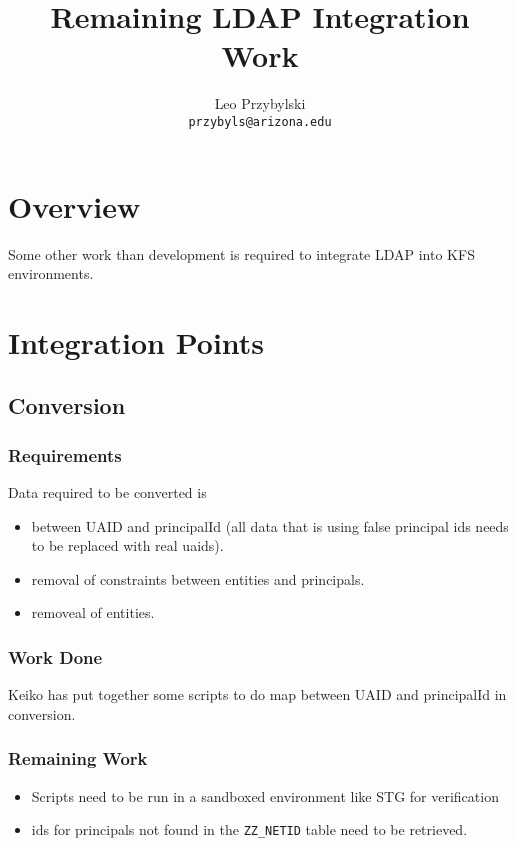 \documentclass[12pt,notitlepage]{article}
\author{Leo Przybylski \\
\texttt{przybyls@arizona.edu}}
\title{Remaining LDAP Integration Work}
\begin{document}
\maketitle

\lstset{basicstyle=\small,
  breaklines=true,
  includerangemarker=false}

\section{Overview}
Some other work than development is required to integrate LDAP into KFS environments.

\section{Integration Points}
\subsection{Conversion}
\subsubsection{Requirements}

Data required to be converted is
\begin{itemize}
  \item between UAID and principalId (all data that is using false principal ids needs to be replaced with real uaids).
  \item removal of constraints between entities and principals.
  \item removeal of entities.
\end{itemize}

\subsubsection{Work Done}
Keiko has put together some scripts to do map between UAID and principalId in conversion.

\subsubsection{Remaining Work}
\begin{itemize}
  \item Scripts need to be run in a sandboxed environment like STG for verification
  \item ids for principals not found in the \verb|ZZ_NETID| table need to be retrieved. 
\end{itemize}
\end{document}
